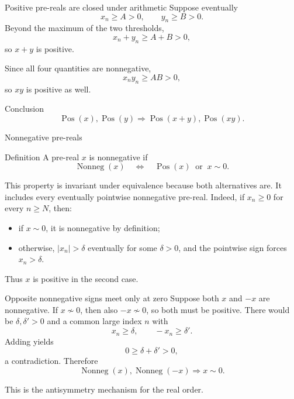 \documentclass[aspectratio=169,11pt]{beamer}
\begin{document}
\begin{frame}{Positive pre-reals are closed under arithmetic}
  Suppose eventually
  \[
    x_n\ge A>0,
    \qquad
    y_n\ge B>0.
  \]
  Beyond the maximum of the two thresholds,
  \[
    x_n+y_n\ge A+B>0,
  \]
  so \(x+y\) is positive.

  Since all four quantities are nonnegative,
  \[
    x_ny_n\ge AB>0,
  \]
  so \(xy\) is positive as well.

  \begin{block}{Conclusion}
    \[
      \operatorname{Pos}(x),\operatorname{Pos}(y)
      \Longrightarrow
      \operatorname{Pos}(x+y),\operatorname{Pos}(xy).
    \]
  \end{block}
\end{frame}

\begin{frame}{Nonnegative pre-reals}
  \begin{block}{Definition}
    A pre-real \(x\) is \alert{nonnegative} if
    \[
      \operatorname{Nonneg}(x)
      \quad\Longleftrightarrow\quad
      \operatorname{Pos}(x)\ \text{ or }\ x\sim0.
    \]
  \end{block}

  This property is invariant under equivalence because both alternatives are.
  It includes every eventually pointwise nonnegative pre-real.  Indeed, if
  \(x_n\ge0\) for every \(n\ge N\), then:
  \begin{itemize}
    \item if \(x\sim0\), it is nonnegative by definition;
    \item otherwise, \(|x_n|>\delta\) eventually for some \(\delta>0\), and
      the pointwise sign forces \(x_n>\delta\).
  \end{itemize}
  Thus \(x\) is positive in the second case.
\end{frame}

\begin{frame}{Opposite nonnegative signs meet only at zero}
  Suppose both \(x\) and \(-x\) are nonnegative.  If \(x\not\sim0\), then
  also \(-x\not\sim0\), so both must be positive.  There would be
  \(\delta,\delta'>0\) and a common large index \(n\) with
  \[
    x_n\ge\delta,
    \qquad
    -x_n\ge\delta'.
  \]
  Adding yields
  \[
    0\ge\delta+\delta'>0,
  \]
  a contradiction.  Therefore
  \[
    \boxed{\operatorname{Nonneg}(x),\operatorname{Nonneg}(-x)
      \Longrightarrow x\sim0.}
  \]

  This is the antisymmetry mechanism for the real order.
\end{frame}
\end{document}
